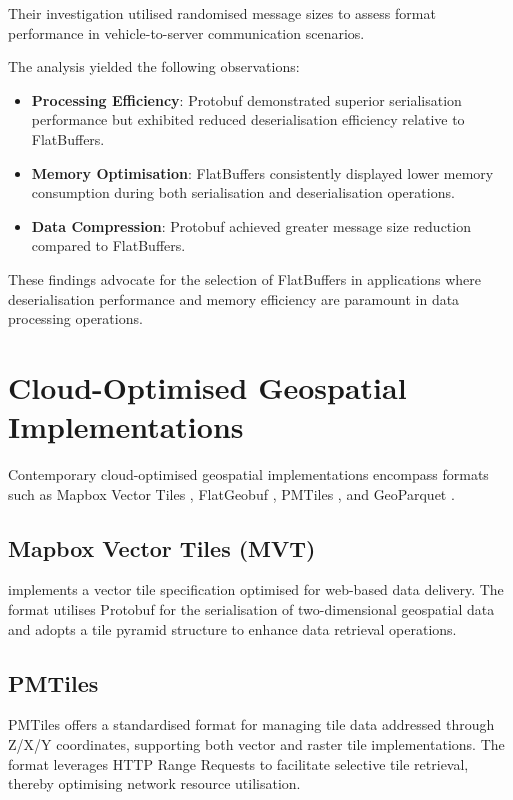 Their investigation utilised randomised message sizes to assess format performance in vehicle-to-server communication scenarios.

The analysis yielded the following observations:

\begin{itemize}
  \item \textbf{Processing Efficiency}: Protobuf demonstrated superior serialisation performance but exhibited reduced deserialisation efficiency relative to FlatBuffers.
  \item \textbf{Memory Optimisation}: FlatBuffers consistently displayed lower memory consumption during both serialisation and deserialisation operations.
  \item \textbf{Data Compression}: Protobuf achieved greater message size reduction compared to FlatBuffers.
\end{itemize}

These findings advocate for the selection of FlatBuffers in applications where deserialisation performance and memory efficiency are paramount in data processing operations.

\section{Cloud-Optimised Geospatial Implementations}
\label{rw:cloud_optimised_implementations}
Contemporary cloud-optimised geospatial implementations encompass formats such as Mapbox Vector Tiles \citep{mapbox-vector-tiles}, FlatGeobuf \citep{flatgeobuf}, PMTiles \citep{pmtiles}, and GeoParquet \citep{geoparquet}.

\subsection{Mapbox Vector Tiles (MVT)}
\label{rw:cloud_optimised_implementations:mvt}
\citet{mapbox-vector-tiles} implements a vector tile specification optimised for web-based data delivery. The format utilises Protobuf for the serialisation of two-dimensional geospatial data and adopts a tile pyramid structure to enhance data retrieval operations.

\subsection{PMTiles}
\label{rw:cloud_optimised_implementations:pmtiles}
PMTiles offers a standardised format for managing tile data addressed through Z/X/Y coordinates, supporting both vector and raster tile implementations. The format leverages HTTP Range Requests \citep{http_range_requests} to facilitate selective tile retrieval, thereby optimising network resource utilisation.


